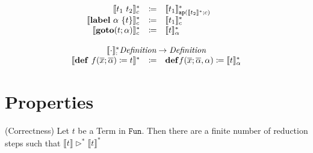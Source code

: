 \documentclass[nonacm]{acmart}
\newcommand{\translate}[1]{\ensuremath{\llbracket#1 \rrbracket}}
\newcommand{\translatestar}[2]{\ensuremath{\llbracket #1 \rrbracket_{#2}^*}}
\newcommand{\reducesto}{\ensuremath{\triangleright}}
\begin{document}
\[\begin{array}{rcl}
    \translatestar{t_1\ t_2}{c} & \coloneq & \translatestar{t_1}{\mathtt{ap}(\translate{t_2}^*;c)}\\
    \translatestar{\mathbf{label}\ \alpha\ \{t\}}{c} & \coloneq & \translatestar{t_1}{c}\\
    \translatestar{\mathbf{goto}(t;\alpha)}{c} & \coloneq & \translatestar{t}{\alpha} \\
    \\
    \multicolumn{3}{c}{\translatestar{\cdot} : \emph{Definition}\rightarrow \emph{Definition}}\\
    \translate{\mathbf{def}\ f(\overline{x};\overline{\alpha}) \coloneq t}^* & \coloneq & \mathbf{def}f(\overline{x};\overline{\alpha},\alpha) \coloneq \translatestar{t}{\alpha}
  \end{array}
\]

\section{Properties}
\label{sec:Properties}

\begin{theorem} (Correctness)
  Let $t$ be a Term in $\mathtt{Fun}$. Then there are a finite number of reduction steps such that $\translate{t}\reducesto^*\translate{t}^*$
\end{theorem}
\end{document}
